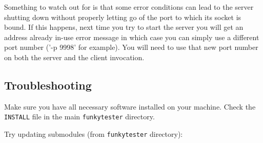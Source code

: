 \documentclass{report}
\newcommand{\ww}{\color{keywords}}	%
\begin{document}
\begin{appendices}
{\ww Something to watch out for is that some error conditions can lead to the server
shutting down without properly letting go of the port to which its socket is
bound. If this happens, next time you try to start the server you will get an
address already in-use error message in which case you can simply use a
different port number ('-p 9998' for example). You will need to use that new
port number on both the server and the client invocation.}

\subsection{Troubleshooting} \label{sec:trouble}
Make sure you have all necessary software installed on your machine. Check the \texttt{INSTALL} file in the main \texttt{funkytester} directory.

Try updating submodules (from \texttt{funkytester} directory):\\


\end{appendices}
\end{document}
